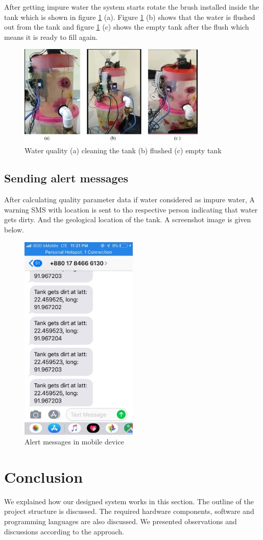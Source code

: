 After getting impure water the system starts rotate the brush installed inside the tank which is shown in figure \ref{flush} (a). Figure \ref{flush} (b) shows that the water is flushed out from the tank and figure \ref{flush} (c) shows the empty tank after the flush which means it is ready to fill again. 
\begin{figure}[h]
\centering
\includegraphics[width=0.8\textwidth]{figures/flush1.png}
\caption{Water quality (a) cleaning the tank (b) flushed (c) empty tank}
\label{flush}
\end{figure}
\subsection{Sending alert messages}
After calculating quality parameter data if water considered as impure water, A warning SMS with location is sent to tho respective person indicating that water gets dirty. And the geological location of the tank.
A screenshot image is given below.

\begin{figure}[H]
\centering
\includegraphics[width=0.5\textwidth]{figures/message.jpg}
\caption{Alert messages in mobile device}
\label{message}
\end{figure}
\section{Conclusion}
We explained how our designed system works in this section. The outline of the project structure is discussed. The required hardware components, software and programming languages are also discussed. We presented observations and discussions according to the approach.